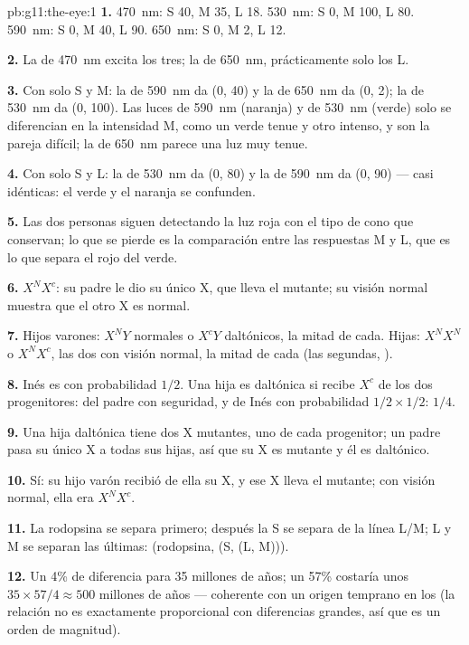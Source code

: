 \begin{solution}{pb:g11:the-eye:1}
\textbf{1.} \qty{470}{nm}: S 40, M 35, L 18. \qty{530}{nm}: S 0, M 100,
L 80. \qty{590}{nm}: S 0, M 40, L 90. \qty{650}{nm}: S 0, M 2, L 12.

\textbf{2.} La de \qty{470}{nm} excita los tres; la de \qty{650}{nm},
prácticamente solo los L.

\textbf{3.} Con solo S y M: la de \qty{590}{nm} da (0, 40) y la de
\qty{650}{nm} da (0, 2); la de \qty{530}{nm} da (0, 100). Las luces de
\qty{590}{nm} (naranja) y de \qty{530}{nm} (verde) solo se diferencian
en la intensidad M, como un verde tenue y otro intenso, y son la pareja
difícil; la de \qty{650}{nm} parece una luz muy tenue.

\textbf{4.} Con solo S y L: la de \qty{530}{nm} da (0, 80) y la de
\qty{590}{nm} da (0, 90) --- casi idénticas: el verde y el naranja se
confunden.

\textbf{5.} Las dos personas siguen detectando la luz roja con el tipo
de cono que conservan; lo que se pierde es la comparación entre las
respuestas M y L, que es lo que separa el rojo del verde.

\textbf{6.} $X^NX^c$: su padre le dio su único X, que lleva el 
mutante; su visión normal muestra que el otro X es normal.

\textbf{7.} Hijos varones: $X^NY$ normales o $X^cY$ daltónicos, la
mitad de cada. Hijas: $X^NX^N$ o $X^NX^c$, las dos con visión normal,
la mitad de cada (las segundas, ).

\textbf{8.} Inés es  con probabilidad $1/2$. Una hija es
daltónica si recibe $X^c$ de los dos progenitores: del padre con
seguridad, y de Inés con probabilidad $1/2 \times 1/2$: $1/4$.

\textbf{9.} Una hija daltónica tiene dos  X mutantes, uno de
cada progenitor; un padre pasa su único X a todas sus hijas, así que su
X es mutante y él es daltónico.

\textbf{10.} Sí: su hijo varón recibió de ella su X, y ese X lleva el
 mutante; con visión normal, ella era $X^NX^c$.

\textbf{11.} La rodopsina se separa primero; después la S se separa de
la línea L/M; L y M se separan las últimas: (rodopsina, (S, (L, M))).

\textbf{12.} Un 4\% de diferencia para 35 millones de años; un 57\%
costaría unos $35 \times 57/4 \approx 500$ millones de años ---
coherente con un origen temprano en los  (la relación no es
exactamente proporcional con diferencias grandes, así que es un orden
de magnitud).


\end{solution}
